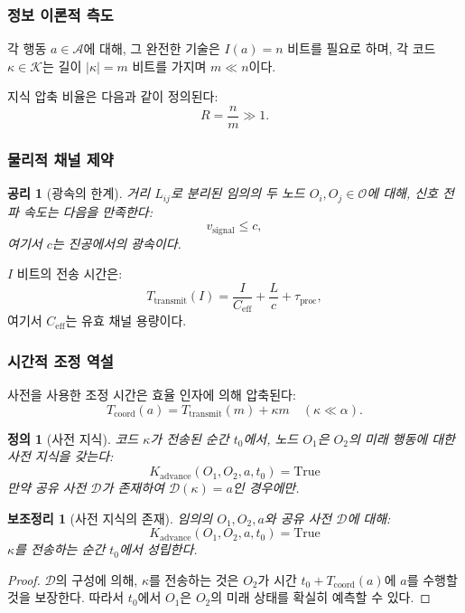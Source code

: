 \documentclass[11pt,a4paper]{article}
\newtheorem{lemma}{보조정리}
\newtheorem{axiom}{공리}
\newtheorem{definition}{정의}
\begin{document}
\subsubsection{정보 이론적 측도}

각 행동 $a \in \mathcal{A}$에 대해, 그 완전한 기술은 $I(a) = n$ 비트를 필요로 하며, 각 코드 $\kappa \in \mathcal{K}$는 길이 $|\kappa| = m$ 비트를 가지며 $m \ll n$이다.

지식 압축 비율은 다음과 같이 정의된다:
\[
R = \frac{n}{m} \gg 1.
\]

\subsubsection{물리적 채널 제약}

\begin{axiom}[광속의 한계]
	거리 $L_{ij}$로 분리된 임의의 두 노드 $O_i, O_j \in \mathcal{O}$에 대해, 신호 전파 속도는 다음을 만족한다:
	\[
	v_{\text{signal}} \leq c,
	\]
	여기서 $c$는 진공에서의 광속이다.
\end{axiom}

$I$ 비트의 전송 시간은:
\[
T_{\text{transmit}}(I) = \frac{I}{C_{\text{eff}}} + \frac{L}{c} + \tau_{\text{proc}},
\]
여기서 $C_{\text{eff}}$는 유효 채널 용량이다.

\subsubsection{시간적 조정 역설}

사전을 사용한 조정 시간은 효율 인자에 의해 압축된다:
\[
T_{\text{coord}}(a) = T_{\text{transmit}}(m) + \kappa m \quad (\kappa \ll \alpha).
\]

\begin{definition}[사전 지식]
	코드 $\kappa$가 전송된 순간 $t_0$에서, 노드 $O_1$은 $O_2$의 미래 행동에 대한 사전 지식을 갖는다:
	\[
	K_{\text{advance}}(O_1, O_2, a, t_0) = \text{True}
	\]
	만약 공유 사전 $\mathcal{D}$가 존재하여 $\mathcal{D}(\kappa) = a$인 경우에만.
\end{definition}

\begin{lemma}[사전 지식의 존재]
	\label{lem:advance-knowledge}
	임의의 $O_1, O_2, a$와 공유 사전 $\mathcal{D}$에 대해:
	\[
	K_{\text{advance}}(O_1, O_2, a, t_0) = \text{True}
	\]
	$\kappa$를 전송하는 순간 $t_0$에서 성립한다.
\end{lemma}

\begin{proof}
	$\mathcal{D}$의 구성에 의해, $\kappa$를 전송하는 것은 $O_2$가 시간 $t_0 + T_{\text{coord}}(a)$에 $a$를 수행할 것을 보장한다. 따라서 $t_0$에서 $O_1$은 $O_2$의 미래 상태를 확실히 예측할 수 있다.
\end{proof}
\end{document}
